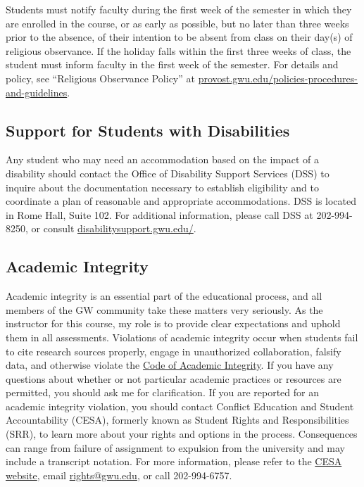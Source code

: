 \documentclass[12pt,letterpaper]{article}
\begin{document}
Students must notify faculty during the first week of the semester in which they are enrolled in the course, or as early as possible, but no later than three weeks prior to the absence, of their intention to be absent from class on their day(s) of religious observance. If the holiday falls within the first three weeks of class, the student must inform faculty in the first week of the semester. For details and policy, see ``Religious Observance Policy'' at \href{https://provost.gwu.edu/policies-procedures-and-guidelines}{provost.gwu.edu/policies-procedures-and-guidelines}.

\subsection*{Support for Students with Disabilities}

Any student who may need an accommodation based on the impact of a disability should contact the Office of Disability Support Services (DSS) to inquire about the documentation necessary to establish eligibility and to coordinate a plan of reasonable and appropriate accommodations. DSS is located in Rome Hall, Suite 102. For additional information, please call DSS at 202-994-8250, or consult \href{https://disabilitysupport.gwu.edu/}{disabilitysupport.gwu.edu/}.

\subsection*{Academic Integrity}

Academic integrity is an essential part of the educational process, and all members of the GW community take these matters very seriously. As the instructor for this course, my role is to provide clear expectations and uphold them in all assessments. Violations of academic integrity occur when students fail to cite research sources properly, engage in unauthorized collaboration, falsify data, and otherwise violate the \href{https://students.gwu.edu/code-academic-integrity}{Code of Academic Integrity}. If you have any questions about whether or not particular academic practices or resources are permitted, you should ask me for clarification. If you are reported for an academic integrity violation, you should contact Conflict Education and Student Accountability (CESA), formerly known as Student Rights and Responsibilities (SRR), to learn more about your rights and options in the process. Consequences can range from failure of assignment to expulsion from the university and may include a transcript notation. For more information, please refer to the \href{https://studentconduct.gwu.edu/academic-integrity}{CESA website}, email \href{mailto:cesa@gwu.edu}{rights@gwu.edu}, or call 202-994-6757. 
\end{document}
